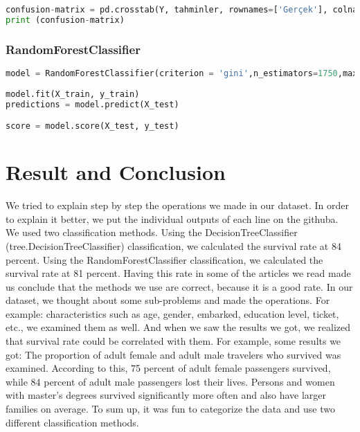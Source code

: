 \documentclass[onecolumn]{article}
\begin{document}
\begin{lstlisting}[language=Python, caption= modeling] 
confusion-matrix = pd.crosstab(Y, tahminler, rownames=['Gerçek'], colnames=['Tahmin'])
print (confusion-matrix)
\end{lstlisting}

\subsubsection{RandomForestClassifier}

\begin{lstlisting}[language=Python, caption=  RandomForestClassifier ] 
model = RandomForestClassifier(criterion = 'gini',n_estimators=1750,max_depth=7,min_samples_split =6, min_samples_leaf = 6, max_features = 'auto', oob_score= True, random_state=42, n_jobs=-1,verbose =1)
            
model.fit(X_train, y_train)
predictions = model.predict(X_test)  

score = model.score(X_test, y_test)
\end{lstlisting}



\section{Result and Conclusion}
We tried to explain step by step the operations we made in our dataset. In order to explain it better, we put the individual outputs of each line on the githuba.
We used two classification methods.
Using the DecisionTreeClassifier (tree.DecisionTreeClassifier) ​​classification, we calculated the survival rate at 84 percent.
Using the RandomForestClassifier classification, we calculated the survival rate at 81 percent.
Having this rate in some of the articles we read made us conclude that the methods we use are correct, because it is a good rate.
In our dataset, we thought about some sub-problems and made the operations. For example: characteristics such as age, gender, embarked, education level, ticket, etc., we examined them as well.
And when we saw the results we got, we realized that survival rate could be correlated with them.
For example, some results we got:
The proportion of adult female and adult male travelers who survived was examined. According to this, 75 percent of adult female passengers survived, while 84 percent of adult male passengers lost their lives.
Persons and women with master's degrees survived significantly more often and also have larger families on average. 
To sum up, it was fun to categorize the data and use two different classification methods.
\end{document}
